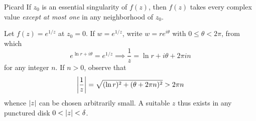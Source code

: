 \begin{thm}{Picard}{}
If $z_0$ is an essential singularity of $f(z)$, then $f(z)$ takes every complex value \emph{except at most one} in any neighborhood of $z_0$.
\end{thm}

\begin{example}{}{}
Let $f(z)=e^{1/z}$ at $z_0=0$. If $w=e^{1/z}$, write $w=re^{i\theta}$ with $0\le \theta<2\pi$, from which
\[e^{\ln r+i\theta}=e^{1/z}\implies \frac 1z=\ln r+i\theta+2\pi in\]
for any integer $n$. If $n>0$, observe that
\[\left| \frac 1z\right|=\sqrt{(\ln r)^2+(\theta+2\pi n)^2}>2\pi n\]
whence $\left| z\right|$ can be chosen arbitrarily small. A suitable $z$ thus exists in any punctured disk $0<\left| z\right|<\delta$.
\end{example}



